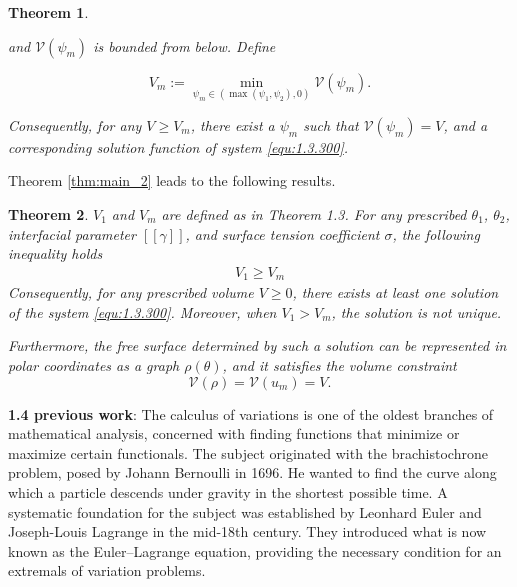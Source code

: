 \documentclass[letterpaper,reqno,10pt,twoside]{amsart}
\newtheorem{theorem}{Theorem}[section]
\theoremstyle{definition}
\theoremstyle{remark}
\begin{document}
\begin{theorem}{\label{thm:main_2}}
\begin{itemize}
            \noindent and $\mathscr{V}(\psi_{m})$ is bounded from below. Define

            \begin{equation*}
                V_{m}:=\min_{\psi_m \in(\max(\psi_1,\psi_2),0)}\mathscr{V}(\psi_m).
            \end{equation*}

            \noindent Consequently, for any $V\ge V_{m}$, there exist a $\psi_m$ such that $\mathscr{V}(\psi_m)=V$, and a corresponding solution function of system \eqref{equ:1.3.300}.
        \end{itemize}
    \end{theorem}
     
     Theorem \ref{thm:main_2} leads to the following results.
     
     \begin{theorem}
         $V_{1}$ and $V_{m}$ are defined as in Theorem 1.3. For any prescribed $\theta_{1}$, $\theta_{2}$, interfacial parameter $[\![\gamma]\!]$, and surface tension coefficient $\sigma$, the following inequality holds
         \begin{align}
         V_{1}\geq V_{m}
         \end{align}
         Consequently, for any prescribed volume $V \ge 0$, there exists at least one solution of the system \eqref{equ:1.3.300}. Moreover, when $V_{1} > V_{m}$, the solution is not unique.
         
         Furthermore, the free surface determined by such a solution can be represented in polar coordinates as a graph $\rho(\theta)$, and it satisfies the volume constraint
\begin{equation}
\mathcal{V}(\rho)=\mathscr{V}(u_{m})=V.
\end{equation}
     \end{theorem}

    \noindent \textbf{1.4 previous work}:
    The calculus of variations is one of the oldest branches of mathematical analysis, concerned with finding functions that minimize or maximize certain functionals. The subject originated with the brachistochrone problem, posed by Johann Bernoulli in 1696. He wanted to find the curve along which a particle descends under gravity in the shortest possible time. A systematic foundation for the subject was established by Leonhard Euler \cite{Euler} and Joseph-Louis Lagrange \cite{Lagrange} in the mid-18th century. They introduced what is now known as the Euler–Lagrange equation, providing the necessary condition for an extremals of variation problems. 
    
\end{document}
